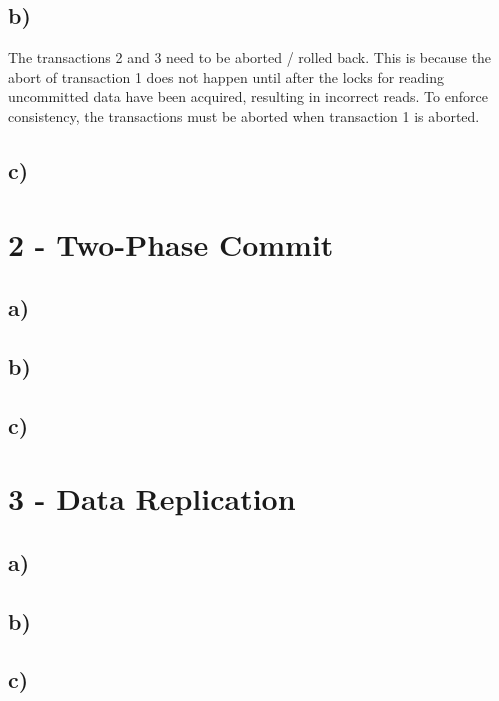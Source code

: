 \documentclass{scrartcl}
\begin{document}
\subsection*{b)}

The transactions 2 and 3 need to be aborted / rolled back.
This is because the abort of transaction 1 does not happen until after the locks for reading uncommitted data have been acquired, resulting in incorrect reads.
To enforce consistency, the transactions must be aborted when transaction 1 is aborted.

\subsection*{c)}

\section*{2 - Two-Phase Commit}
\subsection*{a)}
\subsection*{b)}
\subsection*{c)}

\section*{3 - Data Replication}
\subsection*{a)}
\subsection*{b)}
\subsection*{c)}
\end{document}
